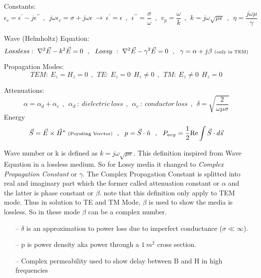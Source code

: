 Constants:
$$ {\epsilon}_c = {\epsilon}^{\prime} - j {\epsilon}^{\prime\prime}  ~~ , ~~ j \omega {\epsilon}_c = \sigma + j \omega \epsilon ~ \rightarrow ~  {\epsilon}^\prime = {\epsilon} ~~ , ~~ {\epsilon}^{\prime\prime} = \frac{\sigma}{\omega}  ~~ , ~~ v_p = \frac{\omega}{k} ~~ , ~~ k = j \omega \sqrt{\mu \epsilon} ~~ , ~~  \eta = \frac{j \omega \mu}{\gamma} $$
\par
Wave (Helmholtz) Equation:
$$Lossless:~ \nabla^2 \vec{E} - k^2 \vec{E} = 0 ~~ , ~~ Lossy ~ : ~ \nabla^2 \vec{E} - {\gamma}^2 \vec{E} = 0 ~~ , ~~ \gamma = \alpha + j\beta~ \text{\scriptsize(only~in~TEM)}  $$
\par
Propagation Modes: 
$$TEM:~ E_z = H_z = 0 ~~ , ~~ TE:~ E_z = 0 ~~ H_z \neq 0 ~~ , ~~ TM:~ E_z \neq 0 ~~ H_z = 0 $$
\par
Attenuations: 
$$ \alpha = {\alpha}_d + {\alpha}_c ~~ , ~~ {\alpha}_d ~: ~ dielectric~loss ~~ , ~~ {\alpha}_c ~ : ~ conductor~loss  ~~ , ~~ \delta = \sqrt{\frac{2}{\omega \mu \sigma}} $$
Energy
$$ \vec{S} = \vec{E} \times  \vec{H}^*~\text{\scriptsize(Poynting~Verctor)} ~~ , ~~ p = \vec{S} \cdot \hat{n} ~~ , ~~ P_{avg} = \frac{1}{2} \text{Re} \int{ \vec{S} \cdot d\vec{s}}$$
\setlength{\parindent}{0.5cm} %
\par
Wave number or k is defined as $ k = j \omega \sqrt{\mu \epsilon} $. This definition inspired from Wave Equation in a lossless medium. So for Lossy media it changed to {\it Complex Propagation Constant} or $\gamma$.  The Complex Propagation Constant is splitted into real and imaginary part which the former called attenuation constant or $\alpha$ and the latter is phase constant or $\beta$. note that this definition only apply to TEM mode. Thus in solution to TE and TM Mode, $\beta$ is used to show the media is lossless. So in these mode $\beta$ can be a complex number.
\setlength{\parindent}{0.0cm}
\par\noindent
\begin{itemize}
\item[--] $\delta$ is an approximation to power loss due to imperfect conductance ($\sigma\ll\infty$).
\item[--] p is power density aka power through a $1~m^2$ cross section.
\item[--] Complex permeability used to show delay between B and H in high frequencies
\end{itemize}
\par
\setlength{\parindent}{0.0cm} %
